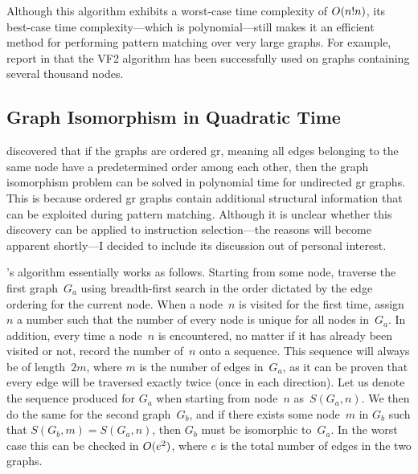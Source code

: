 Although this algorithm exhibits a worst-case time complexity of
\mbox{$O(n!n)$}, its best-case time complexity---which is
polynomial---still makes it an efficient method for performing \gls{pattern
  matching} over very large \glspl{graph}.
%
For example,
\citeauthor{Cordella2001} report in \cite{Cordella2001} that the \gls{VF2}
algorithm has been successfully used on \glspl{graph} containing several
thousand \glspl{node}.


\subsection{Graph Isomorphism in Quadratic Time}

 discovered that if the
\glspl{graph} are \gls{ordered gr}, meaning all \glspl{edge} belonging to the
same node have a predetermined order among each other, then the \gls{graph
  isomorphism} problem can be solved in polynomial time for \gls{undirected gr}
\glspl{graph}.
%
This is because \gls{ordered gr} \glspl{graph} contain additional
structural information that can be exploited during \gls{pattern
  matching}.
%
Although it is unclear whether this discovery can be applied to
\gls{instruction selection}---the reasons will become apparent shortly---I
decided to include its discussion out of personal interest.

\citeauthor{Jiang1996}'s algorithm essentially works as follows.
%
Starting from
some \gls{node}, traverse the first \gls{graph}~$G_a$ using breadth-first search
in the order dictated by the \gls{edge} ordering for the current
\gls{node}.
%
When a \gls{node}~$n$ is visited for the first time, assign $n$ a
number such that the number of every \gls{node} is unique for all \glspl{node}
in~$G_a$.
%
In addition, every time a \gls{node}~$n$ is encountered, no matter if
it has already been visited or not, record the number of~$n$ onto a
sequence.
%
This sequence will always be of length~$2m$, where $m$ is the number
of \glspl{edge} in~$G_a$, as it can be proven that every \gls{edge} will be
traversed exactly twice (once in each direction).
%
Let us denote the sequence
produced for $G_a$ when starting from \gls{node}~$n$ as~\mbox{$S(G_a, n)$}.
%
We
then do the same for the second \gls{graph}~$G_b$, and if there exists some
\gls{node}~$m$ in $G_b$ such that \mbox{$S(G_b, m) = S(G_a, n)$}, then $G_b$
must be \gls{isomorphic} to~$G_a$.
%
In the worst case this can be checked in
$O(e^2)$, where $e$ is the total number of \glspl{edge} in the two
\glspl{graph}.

